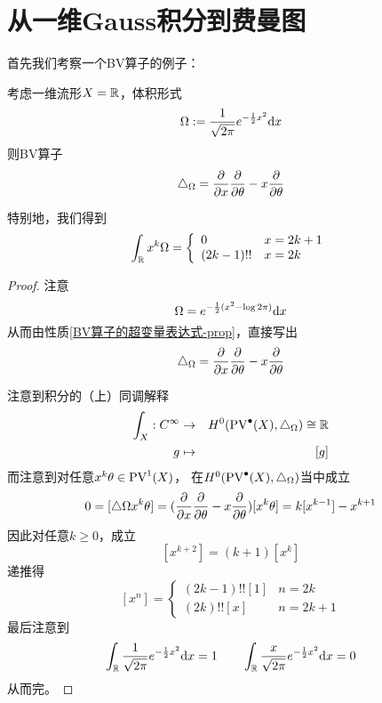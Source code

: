 
\section{从一维Gauss积分到费曼图}
首先我们考察一个BV算子的例子：
\begin{Example}
考虑一维流形$X=\mathbb{R}$，体积形式
$$\Omega:=\frac{1}{\sqrt{2\pi}}e^{-\frac{1}{2}x^2}\mathrm{d} x$$
则BV算子
$$\triangle_{\Omega}=\frac{\partial } {\partial x}\frac{\partial } {\partial \theta}-x\frac{\partial } {\partial \theta}$$

特别地，我们得到
$$
  \int_{\mathbb{R}} x^k\Omega
=
  \left\{
    \begin{array}{ll}
      0          &  x=2k+1\\
      (2k-1)!!   &  x=2k
    \end{array}
  \right.
$$
\end{Example}

\begin{proof}
注意
$$\Omega=e^{-\frac{1}{2}(x^2-\log 2\pi)}\mathrm{d} x$$
从而由性质\ref{BV算子的超变量表达式-prop}，直接写出
$$\triangle_{\Omega}=\frac{\partial } {\partial x}\frac{\partial } {\partial \theta}-x\frac{\partial } {\partial \theta}$$

注意到积分的（上）同调解释
\begin{eqnarray*}
  \int_X:C^{\infty}&\to& H^0(\operatorname{PV}^{\bullet}(X),\triangle_\Omega)\cong\mathbb{R}\\
  g&\mapsto& [g]
\end{eqnarray*}
而注意到对任意$x^k\theta\in \operatorname{PV}^1(X)$，
在$H^0(\operatorname{PV}^{\bullet}(X),\triangle_\Omega)$当中成立
$$0=[\triangle\Omega x^k\theta]=(\frac{\partial } {\partial x}\frac{\partial } {\partial \theta}-x\frac{\partial } {\partial \theta})[x^k\theta]
=k[x^{k-1}]-x^{k+1}$$
因此对任意$k\geq 0$，成立
$$[x^{k+2}]=(k+1)[x^k]$$
递推得
$$
  [x^n]=
  \left\{
    \begin{array}{ll}
      (2k-1)!![1]  & n=2k\\
      (2k)!![x]    & n=2k+1
    \end{array}
  \right.
$$
最后注意到
\begin{eqnarray*}
\int_{\mathbb{R}}
  \frac{1}{\sqrt{2\pi}}
  e^{-\frac{1}{2}x^2}\mathrm{d} x=1\qquad
\int_{\mathbb{R}}
  \frac{x}{\sqrt{2\pi}}
  e^{-\frac{1}{2}x^2}\mathrm{d} x=0
\end{eqnarray*}
从而完。
\end{proof}


